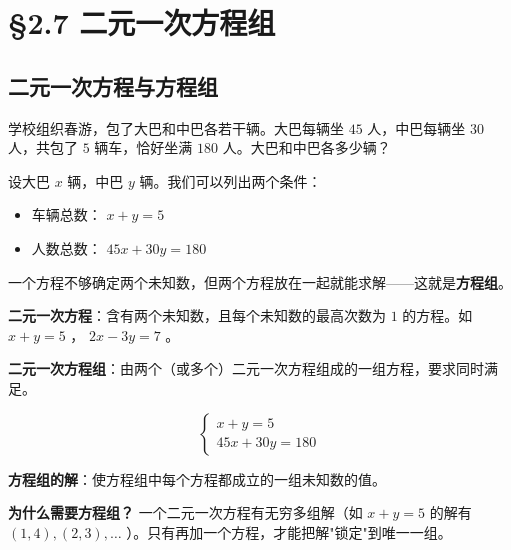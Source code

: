 \chapter{§2.7 二元一次方程组}
\label{sec:2.7}





\section*{二元一次方程与方程组}


\begin{explore}


学校组织春游，包了大巴和中巴各若干辆。大巴每辆坐 $45$ 人，中巴每辆坐 $30$ 人，共包了 $5$ 辆车，恰好坐满 $180$ 人。大巴和中巴各多少辆？

设大巴 $x$ 辆，中巴 $y$ 辆。我们可以列出两个条件：

\begin{itemize}
  \item 车辆总数： $x + y = 5$
  \item 人数总数： $45x + 30y = 180$
\end{itemize}


一个方程不够确定两个未知数，但两个方程放在一起就能求解——这就是\textbf{方程组}。

\end{explore}

\begin{understand}


\textbf{二元一次方程}：含有两个未知数，且每个未知数的最高次数为 $1$ 的方程。如 $x + y = 5$ ， $2x - 3y = 7$ 。

\textbf{二元一次方程组}：由两个（或多个）二元一次方程组成的一组方程，要求同时满足。

\[
\begin{cases} x + y = 5 \\ 45x + 30y = 180 \end{cases}
\]


\textbf{方程组的解}：使方程组中每个方程都成立的一组未知数的值。

\textbf{为什么需要方程组？} 一个二元一次方程有无穷多组解（如 $x + y = 5$ 的解有 $(1,4), (2,3), \ldots$ ）。只有再加一个方程，才能把解"锁定"到唯一一组。

\end{understand}

